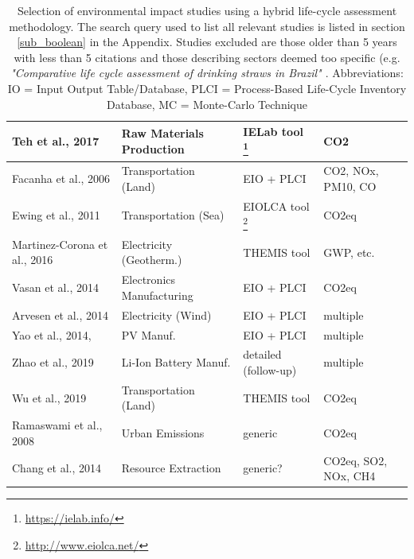 \documentclass{article}
\begin{document}
\begin{table}[H]
\begin{tabularx}{\textwidth}{| X | X | X | X |}
                \hline
                    Teh et al., 2017 \cite{teh_hybrid_2017} & Raw Materials Production & IELab tool \footnote{\url{https://ielab.info/}} & CO2 \\
                \hline
                    Facanha et al., 2006 \cite{horvath_environmental_2006} & Transportation (Land) & EIO + PLCI & CO2, NOx, PM10, CO \\
                \hline
                    Ewing et al., 2011 \cite{ewing_insights_2011} & Transportation (Sea) & EIOLCA tool \footnote{\url{http://www.eiolca.net/}} & CO2eq \\
                \hline
                    Martinez-Corona et al., 2016 \cite{martinez-corona_hybrid_2017} & Electricity (Geotherm.) & THEMIS tool \cite{gibon_methodology_2015} & GWP, etc. \\
                \hline
                    Vasan et al., 2014 \cite{vasan_carbon_2014} & Electronics Manufacturing & EIO + PLCI & CO2eq \\
                \hline
                    Arvesen et al., 2014 \cite{arvesen_life_2014} & Electricity (Wind) & EIO + PLCI & multiple \\
                \hline
                    Yao et al., 2014, \cite{yao_hybrid_2014} & PV Manuf. & EIO + PLCI & multiple \\
                \hline
                    Zhao et al., 2019 \cite{zhao_comparative_2019} & Li-Ion Battery Manuf. & detailed (follow-up) & multiple \\
                \hline
                    Wu et al., 2019 \cite{wu_assessing_2019} & Transportation (Land) & THEMIS tool \cite{gibon_methodology_2015} & CO2eq \\
                \hline
                    Ramaswami et al., 2008 \cite{ramaswami_demand-centered_2008} & Urban Emissions & generic & CO2eq \\
                \hline
                    Chang et al., 2014 \cite{chang_shale--well_2014} & Resource Extraction & generic? & CO2eq, SO2, NOx, CH4 \\
                \hline
            \end{tabularx}
            \caption{Selection of environmental impact studies using a hybrid life-cycle assessment methodology. The search query used to list all relevant studies is listed in section \ref{sub_boolean} in the Appendix. Studies excluded are those older than 5 years with less than 5 citations and those describing sectors deemed too specific (e.g. \textit{"Comparative life cycle assessment of drinking straws in Brazil" \cite{zanghelini_comparative_2020}}. Abbreviations: IO = Input Output Table/Database, PLCI = Process-Based Life-Cycle Inventory Database, MC = Monte-Carlo Technique}
        \end{table}
\end{document}
